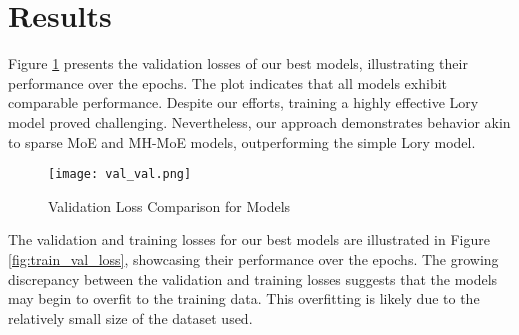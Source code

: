\documentclass[12pt]{article}
\begin{document}
\section{Results}


Figure \ref{fig:validation_loss} presents the validation losses of our best models, illustrating their performance over the epochs. The plot indicates that all models exhibit comparable performance. Despite our efforts, training a highly effective Lory model proved challenging. Nevertheless, our approach demonstrates behavior akin to sparse MoE and MH-MoE models, outperforming the simple Lory model.

\begin{figure}[H]
    \centering
    \texttt{[image: val\_val.png]}
    \caption{Validation Loss Comparison for Models}
    \label{fig:validation_loss}
\end{figure}


The validation and training losses for our best models are illustrated in Figure \ref{fig:train_val_loss}, showcasing their performance over the epochs. The growing discrepancy between the validation and training losses suggests that the models may begin to overfit to the training data. This overfitting is likely due to the relatively small size of the dataset used.
\end{document}
